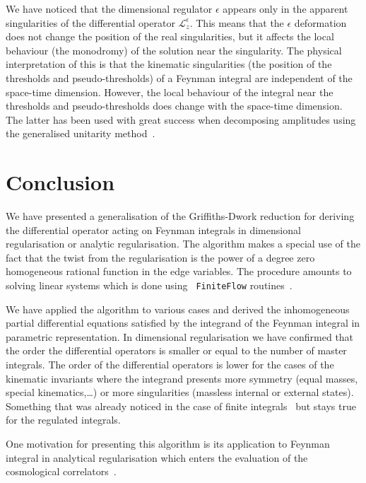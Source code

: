 \documentclass[a4paper,12pt]{article}
\numberwithin{equation}{section}
\numberwithin{figure}{section}
\begin{document}
We have noticed that the dimensional regulator $\epsilon$ appears only in  the
apparent singularities of the differential operator
$\mathscr{L}_z^\epsilon$. This means that the  $\epsilon$ deformation
does not change the position of the real singularities, but it affects
the local behaviour (the monodromy) of the solution near the
singularity.
%
The physical interpretation of this is that the kinematic
singularities (the position of the thresholds
and pseudo-thresholds) of a Feynman integral are independent of the
space-time dimension. However,  the local behaviour of the integral near
the thresholds and pseudo-thresholds does change with the space-time
dimension. The latter has been used with great success
when decomposing amplitudes using the generalised unitarity method~\cite{Bern:2011qt}.

\section{Conclusion}\label{sec:conclusion}
We have presented a generalisation of the Griffiths-Dwork reduction
for deriving the differential operator acting on Feynman integrals in
dimensional regularisation or analytic regularisation. The algorithm
makes a special use of the fact that the twist from the regularisation
is the power of a degree zero homogeneous rational function in the
edge variables. The procedure amounts to
solving linear systems which is done using {\tt
  FiniteFlow} routines~\cite{Peraro:2019svx}.

We have applied the algorithm to various cases and derived the
inhomogeneous partial differential equations satisfied by the integrand of the Feynman integral in parametric representation.
In dimensional regularisation we have confirmed that the order the
differential operators is smaller or equal to the number of master
integrals. The order of the differential operators is lower for the cases of the kinematic invariants where the integrand
presents more symmetry (equal masses, special kinematics,\dots) or
more singularities (massless internal or external states). Something
that was already noticed in the case of finite integrals~\cite{Lairez:2022zkj}  but stays
true for the regulated integrals.

One motivation for presenting this algorithm is its application to
Feynman integral in analytical regularisation which enters the evaluation of the cosmological
correlators~\cite{Heckelbacher:2022hbq,Chowdhury:2023khl,Chowdhury:2023arc}. 
\end{document}
